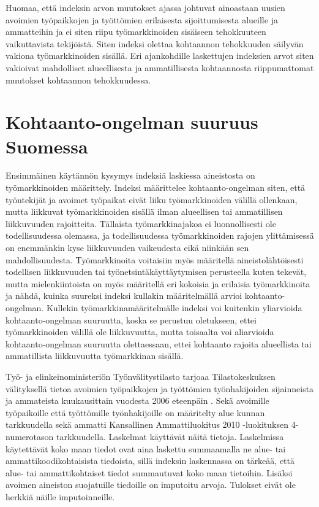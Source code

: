 \documentclass[12pt]{article}
\begin{document}
Huomaa, että indeksin arvon muutokset ajassa johtuvat ainoastaan uusien avoimien työpaikkojen ja työttömien erilaisesta sijoittumisesta alueille ja ammatteihin ja ei siten riipu työmarkkinoiden sisäiseen tehokkuuteen vaikuttavista tekijöistä. Siten indeksi olettaa kohtaannon tehokkuuden säilyvän vakiona työmarkkinoiden sisällä. Eri ajankohdille laskettujen indeksien arvot siten vakioivat mahdolliset alueellisesta ja ammatillisesta kohtaannosta riippumattomat muutokset kohtaannon tehokkuudessa.

\section{Kohtaanto-ongelman suuruus Suomessa} \label{section:kohtaanto-ongelman suuruus suomessa}


Ensimmäinen käytännön kysymys indeksiä laskiessa aineistosta on työmarkkinoiden määrittely. Indeksi määrittelee kohtaanto-ongelman siten, että työntekijät ja avoimet työpaikat eivät liiku työmarkkinoiden välillä ollenkaan, mutta liikkuvat työmarkkinoiden sisällä ilman alueellisen tai ammatillisen liikkuvuuden rajoitteita. Tällaista työmarkkinajakoa ei luonnollisesti ole todellisuudessa olemassa, ja todellisuudessa työmarkkinoiden rajojen ylittämisessä on enemmänkin kyse liikkuvuuden vaikeudesta eikä niinkään sen mahdollisuudesta. Työmarkkinoita voitaisiin myös määritellä aineistolähtöisesti todellisen liikkuvuuden tai työnetsintäkäyttäytymisen perusteella kuten  tekevät, mutta mielenkiintoista on myös määritellä eri kokoisia ja erilaisia työmarkkinoita ja nähdä, kuinka suureksi indeksi kullakin määritelmällä arvioi kohtaanto-ongelman. Kullekin työmarkkinamääritelmälle indeksi voi kuitenkin yliarvioida kohtaanto-ongelman suuruutta, koska se perustuu oletukseen, ettei työmarkkinoiden välillä ole liikkuvuutta, mutta toisaalta voi aliarvioida kohtaanto-ongelman suuruutta olettaessaan, ettei kohtaanto rajoita alueellista tai ammatillista liikkuvuutta työmarkkinan sisällä. 

Työ- ja elinkeinoministeriön Työnvälitystilasto tarjoaa Tilastokeskuksen välityksellä tietoa avoimien työpaikkojen ja työttömien työnhakijoiden sijainneista ja ammateista kuukausittain vuodesta 2006 eteenpäin \cite{svt2011}. Sekä avoimille työpaikoille että työttömille työnhakijoille on määritelty alue kunnan tarkkuudella sekä ammatti Kansallinen Ammattiluokitus 2010 -luokituksen 4-numerotason tarkkuudella. Laskelmat käyttävät näitä tietoja. Laskelmissa käytettävät koko maan tiedot ovat aina laskettu summaamalla ne alue- tai ammattikoodikohtaisista tiedoista, sillä indeksin laskennassa on tärkeää, että alue- tai ammattikohtaiset tiedot summautuvat koko maan tietoihin. Lisäksi avoimen aineiston suojatuille tiedoille on imputoitu arvoja. Tulokset eivät ole herkkiä näille imputoinneille.
\end{document}
